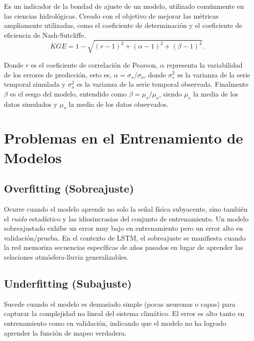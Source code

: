 Es un indicador de la bondad de ajuste de un modelo, utilizado comúnmente en las ciencias hidrológicas. Creado con el objetivo de mejorar las métricas ampliamente utilizadas, como el coeficiente de determinación y el coeficiente de eficiencia de Nash-Sutcliffe.
\begin{equation}
    KGE = 1 -\sqrt{(r-1)^2+(\alpha-1)^2+(\beta-1)^2}.
\end{equation}

Donde $r$ es el coeficiente de correlación de Pearson, $\alpha$ representa la variabilidad de los errores de predicción, esto es, $\alpha=\sigma_s/\sigma_o$, donde $\sigma_s^2$ es la varianza de la serie temporal simulada y $\sigma_o^2$ es la varianza de la serie temporal observada. Finalmente $\beta$ es el sesgo del modelo, entendido como $\beta=\mu_s/\mu_o$, siendo $\mu_s$ la media de los datos simulados y $\mu_o$ la media de los datos observados.

\section{Problemas en el Entrenamiento de Modelos}

\subsection{Overfitting (Sobreajuste)}
Ocurre cuando el modelo aprende no solo la señal física subyacente, sino también el \textit{ruido} estadístico y las idiosincrasias del conjunto de entrenamiento. Un modelo sobreajustado exhibe un error muy bajo en entrenamiento pero un error alto en validación/prueba. En el contexto de LSTM, el sobreajuste se manifiesta cuando la red memoriza secuencias específicas de años pasados en lugar de aprender las relaciones atmósfera-lluvia generalizables.

\subsection{Underfitting (Subajuste)}
Sucede cuando el modelo es demasiado simple (pocas neuronas o capas) para capturar la complejidad no lineal del sistema climático. El error es alto tanto en entrenamiento como en validación, indicando que el modelo no ha logrado aprender la función de mapeo verdadera.

